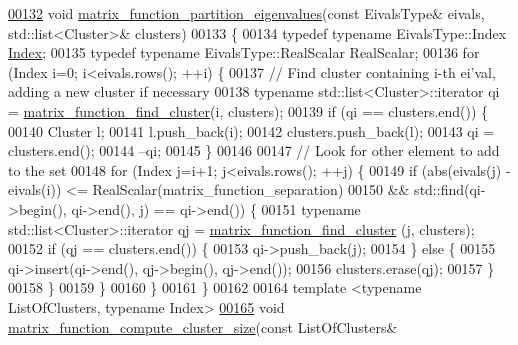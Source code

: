 \begin{DoxyCode}
\hyperlink{namespace_eigen_1_1internal_a9291a6ab4fe0ad1346049a8f2feddeaa}{00132} \textcolor{keywordtype}{void} \hyperlink{namespace_eigen_1_1internal_a9291a6ab4fe0ad1346049a8f2feddeaa}{matrix\_function\_partition\_eigenvalues}(\textcolor{keyword}{const} EivalsType& eivals, 
      std::list<Cluster>& clusters)
00133 \{
00134   \textcolor{keyword}{typedef} \textcolor{keyword}{typename} EivalsType::Index \hyperlink{namespace_eigen_a62e77e0933482dafde8fe197d9a2cfde}{Index};
00135   \textcolor{keyword}{typedef} \textcolor{keyword}{typename} EivalsType::RealScalar RealScalar;
00136   \textcolor{keywordflow}{for} (Index i=0; i<eivals.rows(); ++i) \{
00137     \textcolor{comment}{// Find cluster containing i-th ei'val, adding a new cluster if necessary}
00138     \textcolor{keyword}{typename} std::list<Cluster>::iterator qi = \hyperlink{namespace_eigen_1_1internal_af9cdbae9f4f166fae876c54b97c0f2bb}{matrix\_function\_find\_cluster}(i, 
      clusters);
00139     \textcolor{keywordflow}{if} (qi == clusters.end()) \{
00140       Cluster l;
00141       l.push\_back(i);
00142       clusters.push\_back(l);
00143       qi = clusters.end();
00144       --qi;
00145     \}
00146 
00147     \textcolor{comment}{// Look for other element to add to the set}
00148     \textcolor{keywordflow}{for} (Index j=i+1; j<eivals.rows(); ++j) \{
00149       \textcolor{keywordflow}{if} (abs(eivals(j) - eivals(i)) <= RealScalar(matrix\_function\_separation)
00150           && std::find(qi->begin(), qi->end(), j) == qi->end()) \{
00151         \textcolor{keyword}{typename} std::list<Cluster>::iterator qj = \hyperlink{namespace_eigen_1_1internal_af9cdbae9f4f166fae876c54b97c0f2bb}{matrix\_function\_find\_cluster}
      (j, clusters);
00152         \textcolor{keywordflow}{if} (qj == clusters.end()) \{
00153           qi->push\_back(j);
00154         \} \textcolor{keywordflow}{else} \{
00155           qi->insert(qi->end(), qj->begin(), qj->end());
00156           clusters.erase(qj);
00157         \}
00158       \}
00159     \}
00160   \}
00161 \}
00162 
00164 \textcolor{keyword}{template} <\textcolor{keyword}{typename} ListOfClusters, \textcolor{keyword}{typename} Index>
\hyperlink{namespace_eigen_1_1internal_a1073ba7ac499827baa04c814e4251326}{00165} \textcolor{keywordtype}{void} \hyperlink{namespace_eigen_1_1internal_a1073ba7ac499827baa04c814e4251326}{matrix\_function\_compute\_cluster\_size}(\textcolor{keyword}{const} ListOfClusters& 

\end{DoxyCode}
